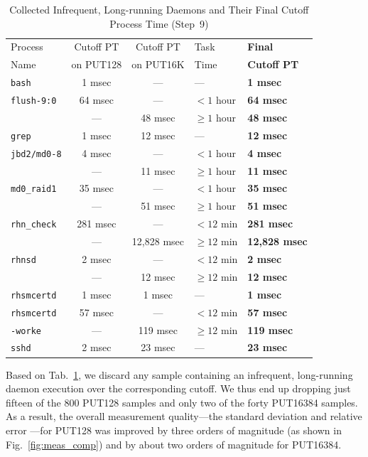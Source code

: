 \documentclass[letter]{ieice}
\begin{document}
\begin{table}[h]
\centering
{\scriptsize
\begin{tabular}{|p{1.2cm}|c|c|p{1cm}|p{1.45cm}|} \hline
Process  & Cutoff PT & Cutoff PT & Task  & {\bf Final } \\
 Name & on PUT128  & on PUT16K & Time & {\bf Cutoff PT} \\\hline
{\tt bash} & 1 msec & --- & --- & {\bf 1 msec} \\ \hline
{\tt flush-9:0} & 64 msec & --- & $< 1$ hour & {\bf 64 msec} \\
                & ---     & 48 msec & $\geq 1$ hour & {\bf 48 msec} \\ \hline
{\tt grep }     & 1 msec & 12 msec & --- & {\bf 12 msec}\\ \hline
{\tt jbd2/md0-8} & 4 msec & --- & $< 1$ hour & {\bf 4 msec} \\
                & ---     & 11 msec & $\geq 1$ hour & {\bf 11 msec} \\ \hline
{\tt md0\_raid1} & 35 msec & ---     & $< 1$ hour  & {\bf 35 msec}\\
                 & ---     & 51 msec & $\geq 1$ hour & {\bf 51 msec} \\ \hline
{\tt rhn\_check}  & 281 msec & --- & $< 12$ min & {\bf 281 msec} \\
                 &  --- & 12,828 msec & $\geq 12$ min & {\bf 12,828 msec}\\ \hline
{\tt rhnsd} & 2 msec & --- & $< 12$ min & {\bf 2 msec} \\
            & ---    & 12 msec &$\geq 12$ min & {\bf 12 msec} \\ \hline
{\tt rhsmcertd}  & 1 msec & 1 msec & --- & {\bf 1 msec} \\  \hline
{\tt rhsmcertd}  & 57 msec & --- & $< 12$ min & {\bf 57 msec} \\
{\tt -worke}           &  --- & 119 msec  & $\geq 12$ min & {\bf 119 msec}\\ \hline
{\tt sshd} & 2 msec & 23 msec & --- & {\bf 23 msec}\\ \hline
\end{tabular}
}
\caption{Collected Infrequent, Long-running Daemons and Their Final Cutoff
  Process Time \hbox{(Step~9)}\label{tab:final_infrequent_cutoff}}
  \vspace{-0.4in}
\end{table}

Based on Tab.~\ref{tab:final_infrequent_cutoff}, 
we discard any sample containing an infrequent, long-running daemon execution
over the corresponding cutoff. We thus end up dropping just fifteen of the 800
PUT128 samples and only two of the forty PUT16384 samples. 
As a result, the overall measurement quality---the standard deviation and relative error 
---for PUT128 was improved 
by three orders of magnitude (as shown in Fig.~\ref{fig:meas_comp}) 
and by about two orders of magnitude for PUT16384.
\end{document}

